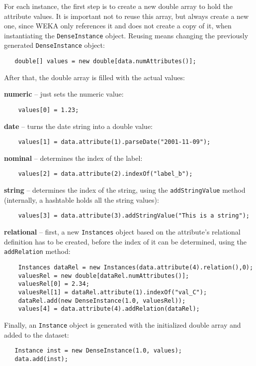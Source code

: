 For each instance, the first step is to create a new double array to hold the
attribute values. It is important not to reuse this array, but always create a
new one, since WEKA only references it and does not create a copy of it, when
instantiating the \texttt{DenseInstance} object. Reusing means changing the
previously generated \texttt{DenseInstance} object:
\begin{verbatim}
   double[] values = new double[data.numAttributes()];
\end{verbatim}
After that, the double array is filled with the actual values:
\begin{tight_itemize}
	\item \textbf{numeric} -- just sets the numeric value:
	\begin{verbatim}
	values[0] = 1.23;
	\end{verbatim}

	\item \textbf{date} -- turns the date string into a double value:
	\begin{verbatim}
	values[1] = data.attribute(1).parseDate("2001-11-09");
	\end{verbatim}

	\item \textbf{nominal} -- determines the index of the label:
	\begin{verbatim}
	values[2] = data.attribute(2).indexOf("label_b");
	\end{verbatim}

	\item \textbf{string} -- determines the index of the string, using the
\texttt{addStringValue} method (internally, a hashtable holds all the string
values):
	\begin{verbatim}
	values[3] = data.attribute(3).addStringValue("This is a string");
	\end{verbatim}

	\item \textbf{relational} -- first, a new \texttt{Instances} object based
on the attribute's relational definition has to be created, before the index
of it can be determined, using the \texttt{addRelation} method:
	\begin{verbatim}
	Instances dataRel = new Instances(data.attribute(4).relation(),0);
	valuesRel = new double[dataRel.numAttributes()];
	valuesRel[0] = 2.34;
	valuesRel[1] = dataRel.attribute(1).indexOf("val_C");
	dataRel.add(new DenseInstance(1.0, valuesRel));
	values[4] = data.attribute(4).addRelation(dataRel);
	\end{verbatim}
\end{tight_itemize}
Finally, an \texttt{Instance} object is generated with the initialized double
array and added to the dataset:
\begin{verbatim}
   Instance inst = new DenseInstance(1.0, values);
   data.add(inst);
\end{verbatim}


